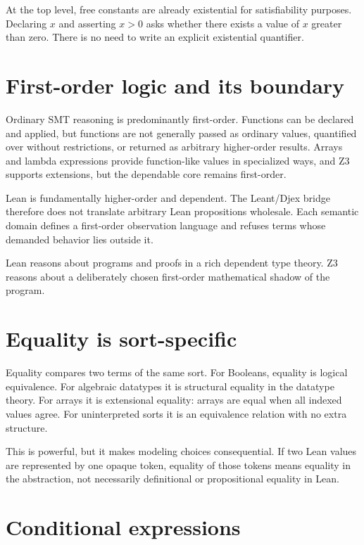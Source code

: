 \documentclass[10pt,letterpaper,oneside]{report}
\begin{document}
At the top level, free constants are already existential for satisfiability purposes. Declaring $x$ and asserting $x>0$ asks whether there exists a value of $x$ greater than zero. There is no need to write an explicit existential quantifier.

\section{First-order logic and its boundary}

Ordinary SMT reasoning is predominantly first-order. Functions can be declared and applied, but functions are not generally passed as ordinary values, quantified over without restrictions, or returned as arbitrary higher-order results. Arrays and lambda expressions provide function-like values in specialized ways, and Z3 supports extensions, but the dependable core remains first-order.

Lean is fundamentally higher-order and dependent. The Leant/Djex bridge therefore does not translate arbitrary Lean propositions wholesale. Each semantic domain defines a first-order observation language and refuses terms whose demanded behavior lies outside it.

\begin{mentalmodel}
Lean reasons about programs and proofs in a rich dependent type theory. Z3 reasons about a deliberately chosen first-order mathematical shadow of the program.
\end{mentalmodel}

\section{Equality is sort-specific}

Equality compares two terms of the same sort. For Booleans, equality is logical equivalence. For algebraic datatypes it is structural equality in the datatype theory. For arrays it is extensional equality: arrays are equal when all indexed values agree. For uninterpreted sorts it is an equivalence relation with no extra structure.

This is powerful, but it makes modeling choices consequential. If two Lean values are represented by one opaque token, equality of those tokens means equality in the abstraction, not necessarily definitional or propositional equality in Lean.

\section{Conditional expressions}
\end{document}
